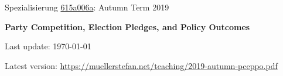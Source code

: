\documentclass[abstract=on,parskip=full,headings=standardclasses,fontsize=11pt,paper=a4]{scrartcl}
\begin{document}
	
\singlespacing

\noindent
{}%
\hfill%

\singlespacing
\vspace{1cm}

\begin{center}
{\large Spezialisierung \href{https://studentservices.uzh.ch/uzh/anonym/vvz/index.html#/details/2019/003/E/50950937}{615a006a}: Autumn Term 2019} \\ 
\bigskip

{\Large \textbf{Party Competition, Election Pledges, and Policy Outcomes}} 
\bigskip


{\large  {Last update: \today}}\\
\bigskip

Latest version: \url{https://muellerstefan.net/teaching/2019-autumn-pceppo.pdf}
\end{center}

\vspace{1.5cm}
\end{document}
